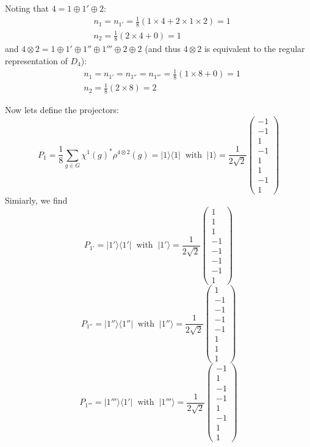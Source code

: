 \documentclass[]{ctexart}
\begin{document}
Noting that $4=1\oplus 1'\oplus 2$: 
\begin{align*}
&n_1=n_{1'}=\frac{1}{8}(1\times 4+2\times1\times 2)=1\\
&n_2=\frac{1}{8}(2\times 4+0)=1
\end{align*}
and $4\otimes 2=1\oplus 1'\oplus1''\oplus1'''\oplus2\oplus 2$ (and thus $4\otimes 2$ is equivalent to the regular representation of $D_4$):
\begin{align*}
&n_1=n_{1'}=n_{1''}=n_{1'''}=\frac{1}{8}(1\times 8+0)=1\\
&n_2=\frac{1}{8}(2\times 8)=2
\end{align*}

Now lets define the projectors: 
\begin{equation*}
P_1=\frac{1}{8}\sum_{g\in G}\chi^1(g)^*\rho^{4\otimes 2}(g)=|1\rangle\langle 1|\;\;\text{with}\;\;|1\rangle=\frac{1}{2\sqrt{2}}\begin{pmatrix}
-1\\-1\\1\\-1\\1\\1\\-1\\1
\end{pmatrix}
\end{equation*}
Simiarly, we find 
\begin{equation*}
P_{1'}=|1'\rangle\langle1'|\;\;\text{with}\;\;|1'\rangle=\frac{1}{2\sqrt{2}}\begin{pmatrix}
1\\1\\1\\-1\\-1\\-1\\-1\\1
\end{pmatrix}
\end{equation*}
\begin{equation*}
P_{1''}=|1''\rangle\langle1''|\;\;\text{with}\;\;|1''\rangle=\frac{1}{2\sqrt{2}}\begin{pmatrix}
1\\-1\\-1\\-1\\-1\\1\\1\\1
\end{pmatrix}
\end{equation*}
\begin{equation*}
P_{1'''}=|1'''\rangle\langle1'|\;\;\text{with}\;\;|1'''\rangle=\frac{1}{2\sqrt{2}}\begin{pmatrix}
-1\\1\\-1\\-1\\1\\-1\\1\\1
\end{pmatrix}
\end{equation*}
\end{document}
